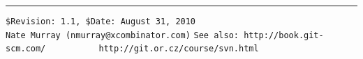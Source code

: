 \documentclass[footexclude,twocolumn,DIV25,fontsize=10pt]{scrreprt}
\begin{document}
\begin{flushright}
\footnotesize
\rule{0.7\linewidth}{0.25pt}
\verb!$Revision: 1.1, $Date: August 31, 2010!\\
\verb!Nate Murray (nmurray@xcombinator.com)!
\verb!See also: http://book.git-scm.com/!
\verb!          http://git.or.cz/course/svn.html!
\end{flushright}

%
%
\end{document}

